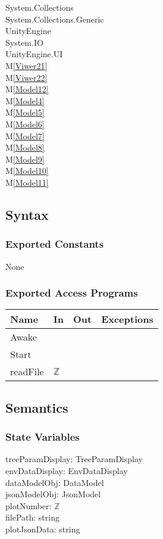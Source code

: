 \documentclass[12pt, titlepage]{article}
\newcommand{\mref}[1]{M\ref{#1}}
\begin{document}
System.Collections\\
System.Collections.Generic\\
UnityEngine\\
System.IO\\
UnityEngine.UI\\
\mref{Viwer21}\\
\mref{Viwer22}\\
\mref{Model12}\\
\mref{Model4}\\
\mref{Model5}\\
\mref{Model6}\\
\mref{Model7}\\
\mref{Model8}\\
\mref{Model9}\\
\mref{Model10}\\
\mref{Model11}\\


\subsection{Syntax}
\subsubsection{Exported Constants}
None
\subsubsection{Exported Access Programs}
\begin{center}
\begin{tabular}{|l|l|l|p{5cm}|}
\hline
\textbf{Name} & \textbf{In} & \textbf{Out} & \textbf{Exceptions} \\
\hline
Awake &  &  &  \\
\hline
Start& & & \\ 
\hline
readFile& $\mathbb{Z}$ & & \\
\hline
\end{tabular}
\end{center}

\subsection{Semantics}
\subsubsection{State Variables}
treeParamDisplay: TreeParamDisplay\\
envDataDisplay: EnvDataDisplay\\
dataModelObj: DataModel\\
jsonModelObj: JsonModel\\
plotNumber: $\mathbb{Z}$\\
filePath: string\\
plotJsonData: string
\end{document}
